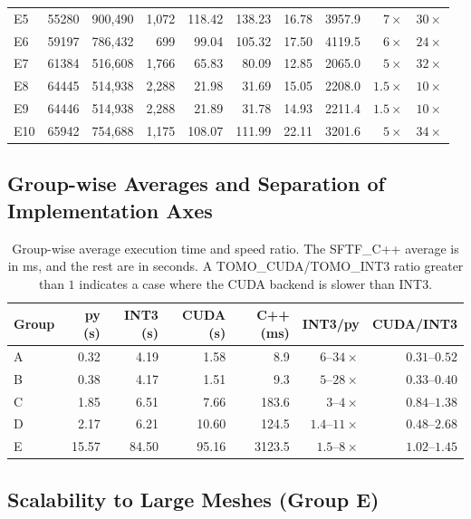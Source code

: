 \documentclass[11pt,a4paper]{article}
\begin{document}
\begin{table}[H]
{\begin{tabular}{llrrrrrrrr}
E5  & 55280 & 900{,}490   & 1{,}072 & 118.42 & 138.23 & 16.78 & 3957.9 & $7\times$   & $30\times$\\
E6  & 59197 & 786{,}432   & 699   & 99.04  & 105.32 & 17.50 & 4119.5 & $6\times$   & $24\times$\\
E7  & 61384 & 516{,}608   & 1{,}766 & 65.83  & 80.09  & 12.85 & 2065.0 & $5\times$   & $32\times$\\
E8  & 64445 & 514{,}938   & 2{,}288 & 21.98  & 31.69  & 15.05 & 2208.0 & $1.5\times$ & $10\times$\\
E9  & 64446 & 514{,}938   & 2{,}288 & 21.89  & 31.78  & 14.93 & 2211.4 & $1.5\times$ & $10\times$\\
E10 & 65942 & 754{,}688   & 1{,}175 & 108.07 & 111.99 & 22.11 & 3201.6 & $5\times$   & $34\times$\\
\bottomrule
\end{tabular}
}
\end{table}

\subsection{Group-wise Averages and Separation of Implementation Axes}
\label{sec:impl-compare}

\begin{table}[H]
\footnotesize
\centering
\caption{Group-wise average execution time and speed ratio.
The SFTF\_C++ average is in ms, and the rest are in seconds.
A TOMO\_CUDA/TOMO\_INT3 ratio greater than $1$ indicates a case where the CUDA backend is slower than INT3.}
\label{tab:fivegroup-impl}
\begin{tabular}{lrrrrrr}
\toprule
Group & py (s) & INT3 (s) & CUDA (s) & C++ (ms) & INT3/py & CUDA/INT3\\
\midrule
A & 0.32 & 4.19  & 1.58  & 8.9    & $6$--$34\times$   & $0.31$--$0.52$\\
B & 0.38 & 4.17  & 1.51  & 9.3    & $5$--$28\times$   & $0.33$--$0.40$\\
C & 1.85 & 6.51  & 7.66  & 183.6  & $3$--$4\times$    & $0.84$--$1.38$\\
D & 2.17 & 6.21  & 10.60 & 124.5  & $1.4$--$11\times$ & $0.48$--$2.68$\\
E & 15.57 & 84.50 & 95.16 & 3123.5 & $1.5$--$8\times$  & $1.02$--$1.45$\\
\bottomrule
\end{tabular}
\end{table}

\subsection{Scalability to Large Meshes (Group E)}
\label{sec:groupE}
\end{document}
